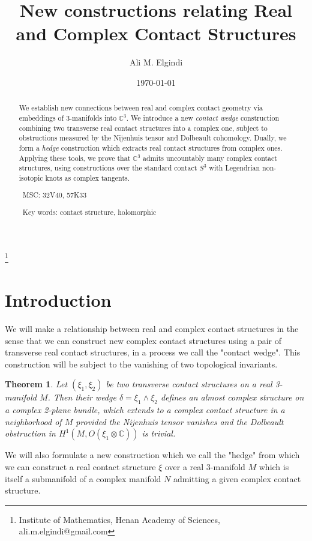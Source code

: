 \documentclass{amsart}
\newtheorem{theorem}{Theorem}
\newcommand{\C}{\mathbb{C}}
\begin{document}
\title{New constructions relating Real and Complex Contact Structures}
\author{Ali M. Elgindi}
\thanks{Institute of Mathematics, Henan Academy of Sciences, ali.m.elgindi@gmail.com}
\date{\today}



\begin{abstract}
We establish new connections between real and complex contact geometry via embeddings of 3-manifolds into $\C^3$. We introduce a new \emph{contact wedge} construction combining two transverse real contact structures into a complex one, subject to obstructions measured by the Nijenhuis tensor and Dolbeault cohomology. Dually, we form a \emph{hedge} construction which extracts real contact structures from complex ones. Applying these tools, we prove that $\C^3$ admits uncountably many complex contact structures, using constructions over the standard contact $S^3$ with Legendrian non-isotopic knots as complex tangents.
\par\
MSC: 32V40, 57K33
\par\
Key words: contact structure, holomorphic 

\end{abstract}
\maketitle

\section{Introduction}

We will make a relationship between real and complex contact structures in the sense that we can construct new complex contact structures using a pair of transverse real contact structures, in a process we call the "contact wedge". This construction will be subject to the vanishing of two topological invariants.

\begin{theorem}
Let $(\xi_1, \xi_2)$ be two transverse contact structures on a real 3-manifold $M$. Then their wedge $\delta = \xi_1 \wedge \xi_2$ defines an almost complex structure on a complex 2-plane bundle, which extends to a complex contact structure in a neighborhood of $M$ provided the Nijenhuis tensor vanishes and the Dolbeault obstruction in $H^1(M, O(\xi_1 \otimes \C))$ is trivial.
\end{theorem}

We will also formulate a new construction which we call the "hedge" from which we can construct a real contact structure $\xi$ over a real 3-manifold $M$ which is itself a submanifold of a complex manifold $N$ admitting a given complex contact structure.
\end{document}
